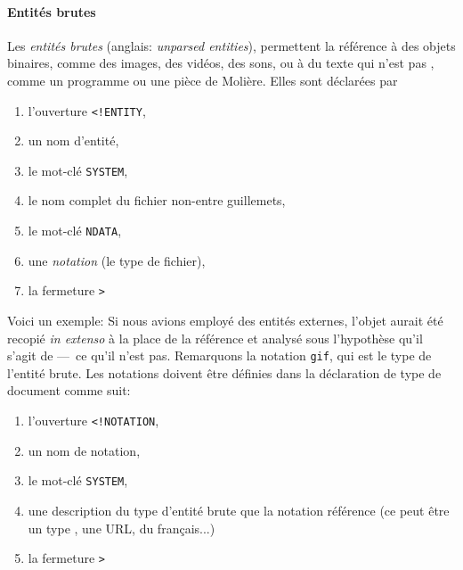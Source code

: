 \paragraph{Entités brutes}

Les \emph{entités brutes} (anglais: \emph{unparsed entities}),
permettent la référence à des objets binaires, comme des images, des
vidéos, des sons, ou à du texte qui n'est pas \XML, comme un programme
ou une pièce de Molière. Elles sont déclarées par
\begin{enumerate}

  \item l'ouverture \verb|<!ENTITY|,

  \item un nom d'entité,

  \item le mot-clé \verb|SYSTEM|,

  \item le nom complet du fichier non-\XML entre guillemets,

  \item le mot-clé \verb|NDATA|,

  \item une \emph{notation} (le type de fichier),

  \item la fermeture \verb|>|

\end{enumerate}
Voici un exemple:
\noindent Si nous avions employé des entités externes, l'objet aurait
été recopié \emph{in extenso} à la place de la référence et analysé
sous l'hypothèse qu'il s'agit de \XML ---~ce qu'il n'est
pas. Remarquons la notation \texttt{gif}, qui est le type de l'entité
brute. Les notations doivent être définies dans la déclaration de type
de document comme suit:
\begin{enumerate}

  \item l'ouverture \verb|<!NOTATION|,

  \item un nom de notation,

  \item le mot-clé \verb|SYSTEM|,

  \item une description du type d'entité brute que la notation
    référence (ce peut être un type \MIME, une URL, du français...)

  \item la fermeture \verb|>|

\end{enumerate}
